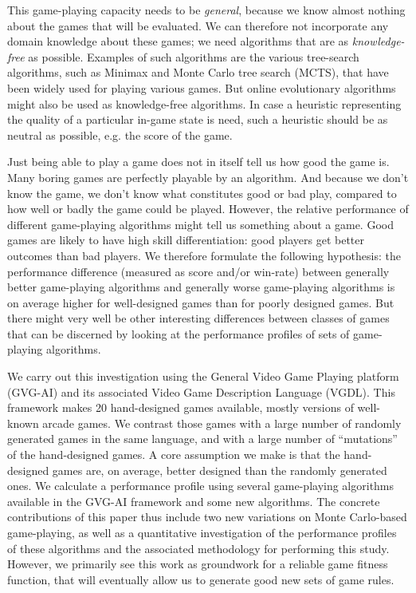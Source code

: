 \documentclass{llncs}
\begin{document}
This game-playing capacity needs to be \emph{general}, because we know almost nothing about the games that will be evaluated. We can therefore not incorporate any domain knowledge about these games; we need algorithms that are as \emph{knowledge-free} as possible. Examples of such algorithms are the various tree-search algorithms, such as Minimax and Monte Carlo tree search (MCTS), that have been widely used for playing various games. But online evolutionary algorithms might also be used as knowledge-free algorithms. In case a heuristic representing the quality of a particular in-game state is need, such a heuristic should be as neutral as possible, e.g. the score of the game.

Just being able to play a game does not in itself tell us how good the game is. Many boring games are perfectly playable by an algorithm. And because we don't know the game, we don't know what constitutes good or bad play, compared to how well or badly the game could be played. However, the relative performance of different game-playing algorithms might tell us something about a game. Good games are likely to have high skill differentiation: good players get better outcomes than bad players. We therefore formulate the following hypothesis: the performance difference (measured as score and/or win-rate) between generally better game-playing algorithms and generally worse game-playing algorithms is on average higher for well-designed games than for poorly designed games. But there might very well be other interesting differences between classes of games that can be discerned by looking at the performance profiles of sets of game-playing algorithms.

We carry out this investigation using the General Video Game Playing platform (GVG-AI) and its associated Video Game Description Language (VGDL). This framework makes 20 hand-designed games available, mostly versions of well-known arcade games. We contrast those games with a large number of randomly generated games in the same language, and with a large number of ``mutations'' of the hand-designed games. A core assumption we make is that the hand-designed games are, on average, better designed than the randomly generated ones. We calculate a performance profile using several game-playing algorithms available in the GVG-AI framework and some new algorithms. The concrete contributions of this paper thus include two new variations on Monte Carlo-based game-playing, as well as a quantitative investigation of the performance profiles of these algorithms and the associated methodology for performing this study. However, we primarily see this work as groundwork for a reliable game fitness function, that will eventually allow us to generate good new sets of game rules.
\end{document}
